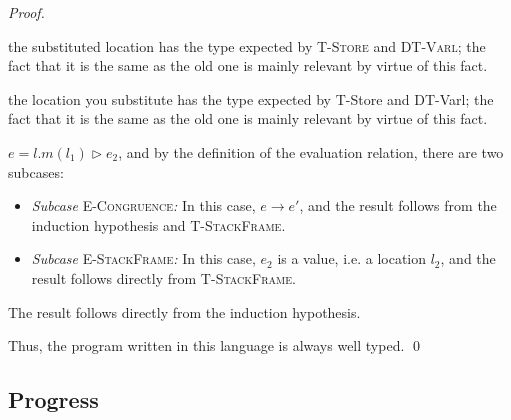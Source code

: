 \documentclass{llncs}
\newcommand{\pcase}[1][]{
  \if\relax\detokenize{#1}\relax
    \def\thiscase{}
  \else
    \def\thiscase{~#1}
  \fi
  \item
}
\begin{document}
\begin{proof}
\begin{pcases}
\begin{itemize}
the substituted location has the type expected by \textsc{T-Store} and \textsc{DT-Varl}; the fact that it is the same as the old one is mainly relevant by virtue of this fact.

the location you substitute has the type expected by T-Store and DT-Varl; the fact that it is the same as the old one is mainly relevant by virtue of this fact.
\\
\end{itemize}

\pcase[\textsc{T-StackFrame}]
$e = l.m(l_1) \rhd e_2$, and by the definition of the evaluation relation, there are two subcases:
\\
\begin{itemize}
\item[]  \textit{Subcase} \textsc{E-Congruence}\textit{:} In this case, $e \longrightarrow e'$, and the result follows from the induction hypothesis and \textsc{T-StackFrame}.
\\
\item[]  \textit{Subcase} \textsc{E-StackFrame}\textit{:} In this case, $e_2$ is a value, i.e. a location $l_2$, and the result follows directly from \textsc{T-StackFrame}.
\\
\end{itemize}

\pcase[\textsc{T-Sub}]
The result follows directly from the induction hypothesis.
\\
\end{pcases}

\noindent Thus, the program written in this language is always well typed. \qed

\end{proof}


\subsection{Progress}
\end{document}
